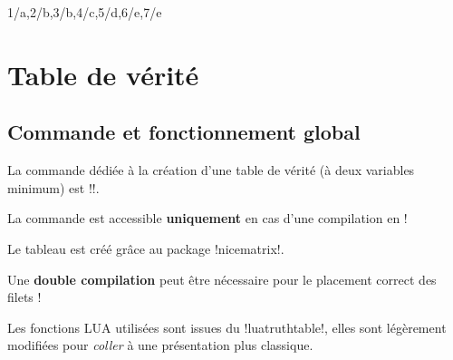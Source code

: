 \documentclass[french,a4paper,11pt]{article}
\begin{document}
{{\begin{DemoCode}[]
%
	{1/a,2/b,3/b,4/c,5/d,6/e,7/e}%
\end{DemoCode}

\begin{DemoCode}[]
\end{DemoCode}

\pagebreak

\section{Table de vérité}

\subsection{Commande et fonctionnement global}

\begin{cautionblock}
La commande dédiée à la création d'une table de vérité (à deux variables minimum) est \motcletex!\TableVerite!.

La commande est accessible \textbf{uniquement} en cas d'une compilation en  !

Le tableau est créé grâce au package \packagetex!nicematrix!.
\end{cautionblock}

\begin{importantblock}
Une \textbf{double compilation} peut être nécessaire pour le placement correct des filets !

Les fonctions \textsf{LUA} utilisées sont issues du \packagetex!luatruthtable!, elles sont légèrement modifiées pour \textit{coller} à une présentation plus classique.
\end{importantblock}

\begin{DemoCode}
\end{DemoCode}

}}
\end{document}
